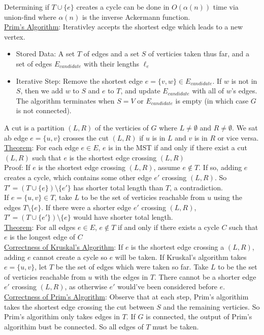 \documentclass{article}
\begin{document}
Determining if $T \cup \{e\}$ creates a cycle can be done in $O(\alpha(n))$ time via union-find where $\alpha(n)$ is the inverse Ackermann function. \\[1.0ex]
\underline{Prim's Algorithm}: Iterativley accepts the shortest edge which leads to a new vertex.
\begin{itemize}
    \item Stored Data: A set $T$ of edges and a set $S$ of verticies taken thus far, and a set of edges $E_{candidate}$ with their lengths $\ell_e$
    \item Iterative Step: Remove the shortest edge $e = \{v, w\} \in E_{candidate}$. If $w$ is not in $S$, then we add $w$ to $S$ and $e$ to $T$, and update $E_{candidate}$ with all of $w$'s edges. The algorithm terminates when $S = V$ or $E_{candidate}$ is empty (in which case $G$ is not connected).
\end{itemize}
A cut is a partition $(L, R)$ of the verticies of $G$ where $L \neq \emptyset$ and $R \neq \emptyset$. We sat ab edge $e = \{u, v\}$ crosses the cut $(L, R)$ if $u$ is in $L$ and $v$ is in $R$ or vice versa. \\[0.5ex]
\underline{Theorem}: For each edge $e \in E$, $e$ is in the MST if and only if there exist a cut $(L, R)$ such that $e$ is the shortest edge crossing $(L, R)$\\[0.5ex]
Proof: If $e$ is the shortest edge crossing $(L, R)$, assume $e \notin T$. If so, adding $e$ creates a cycle, which contains some other edge $e'$ crossing $(L, R)$. So $T' = (T \cup \{e\}) \setminus \{e'\}$ has shorter total length than $T$, a contradiction. \\
If $e = \{u, v\} \in T$, take $L$ to be the set of verticies reachable from $u$ using the edges $T \setminus \{e\}$. If there were a shorter edge $e'$ crossing $(L, R)$, $T' = (T \cup \{e'\}) \setminus \{e\}$ would have shorter total length. \\[1.0ex]
\underline{Theorem}: For all edges $e \in E$, $e \notin T$ if and only if there exists a cycle $C$ such that $e$ is the longest edge of $C$ \\[1.0ex]
\underline{Correctness of Kruskal's Algorithm}: If $e$ is the shortest edge crossing a $(L, R)$, adding $e$ cannot create a cycle so $e$ will be taken. If Kruskal's algorithm takes $e = \{u, v\}$, let $T$ be the set of edges which were taken so far. Take $L$ to be the set of verticies reachable from $u$ with the edges in $T$. There cannot be a shorter edge $e'$ crossing $(L, R)$, as otherwise $e'$ would've been considered before $e$. \\[1.0ex]
\underline{Correctness of Prim's Algorithm}: Observe that at each step, Prim's algorithim takes the shortest edge crossing the cut between $S$ and the remaining verticies. So Prim's algorithim only takes edges in $T$. If $G$ is connected, the output of Prim's algorithim bust be connected. So all edges of $T$ must be taken. 
\end{document}
